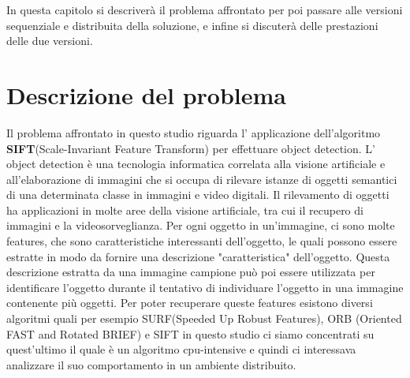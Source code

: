 In questa capitolo si descriverà il problema affrontato per poi passare alle versioni sequenziale e distribuita della soluzione, e infine si discuterà delle prestazioni delle due versioni.
\newline
\section{Descrizione del problema}

Il problema affrontato in questo studio riguarda l' applicazione dell'algoritmo \textbf{SIFT}(Scale-Invariant Feature Transform) per effettuare object detection. L' object detection è una tecnologia informatica correlata alla visione artificiale e all'elaborazione di immagini che si occupa di rilevare istanze di oggetti semantici di una determinata classe in immagini e video digitali. Il rilevamento di oggetti ha applicazioni in molte aree della visione artificiale, tra cui il recupero di immagini e la videosorveglianza. 
Per ogni oggetto in un'immagine, ci sono molte features, che sono caratteristiche interessanti dell'oggetto, le quali possono essere estratte in modo da fornire una descrizione "caratteristica" dell'oggetto. Questa descrizione estratta da una immagine campione può poi essere utilizzata per identificare l'oggetto durante il tentativo di individuare l'oggetto in una immagine contenente più oggetti. Per poter recuperare queste features esistono diversi algoritmi quali per esempio SURF(Speeded Up Robust Features), ORB (Oriented FAST and Rotated BRIEF) e SIFT in questo studio ci siamo concentrati su quest'ultimo il quale è un algoritmo cpu-intensive e quindi ci interessava analizzare il suo comportamento in un ambiente distribuito.

